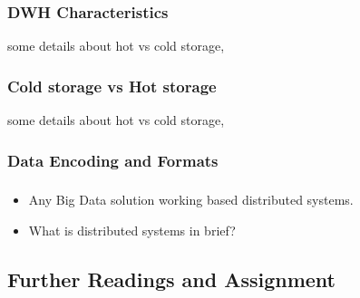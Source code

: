 \begin{frame}
\frametitle{DWH Characteristics}



some details about hot vs cold storage,

\end{frame}

\begin{frame}

\frametitle{Cold storage vs Hot storage}

some details about hot vs cold storage,

\end{frame}

\subsubsection{Data Encoding and Formats}
\begin{frame}
\frametitle{\subsecname}
\begin{itemize}[<+->]
\item Any Big Data solution working based distributed systems.
\item What is distributed systems in brief?
\end{itemize}
\end{frame}

\subsection{Further Readings and Assignment}


